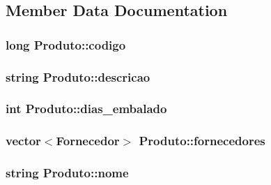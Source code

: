 \subsection{Member Data Documentation}
\hypertarget{class_produto_ae550723b388b42aa8d64ae25da28a989}{
\subsubsection[{codigo}]{\setlength{\rightskip}{0pt plus 5cm}long {\bf Produto::codigo}}}
\label{class_produto_ae550723b388b42aa8d64ae25da28a989}
\hypertarget{class_produto_a23d49580a8e69e8ad100f1e903951df0}{
\subsubsection[{descricao}]{\setlength{\rightskip}{0pt plus 5cm}string {\bf Produto::descricao}}}
\label{class_produto_a23d49580a8e69e8ad100f1e903951df0}
\hypertarget{class_produto_ad41c279a89d62234c5be52dc66e43de7}{
\subsubsection[{dias\_\-embalado}]{\setlength{\rightskip}{0pt plus 5cm}int {\bf Produto::dias\_\-embalado}}}
\label{class_produto_ad41c279a89d62234c5be52dc66e43de7}
\hypertarget{class_produto_a9a4cce6876ccbfca25f41851bd48b706}{
\subsubsection[{fornecedores}]{\setlength{\rightskip}{0pt plus 5cm}vector$<${\bf Fornecedor}$>$ {\bf Produto::fornecedores}}}
\label{class_produto_a9a4cce6876ccbfca25f41851bd48b706}
\hypertarget{class_produto_a68b0af895e00da960bea4fb9d22908a4}{
\subsubsection[{nome}]{\setlength{\rightskip}{0pt plus 5cm}string {\bf Produto::nome}}}
